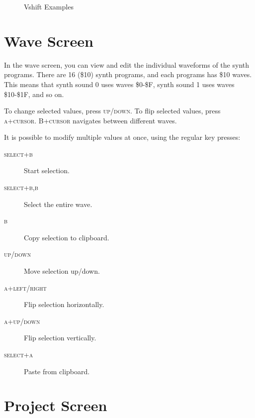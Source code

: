 \begin{figure}[htpb]
	\centering


	\caption{Vshift Examples}
	\label{fig:vshift}
\end{figure}

\section{Wave Screen}
\label{wave-screen-section}

In the wave screen, you can view and edit the individual waveforms of the synth programs. There are 16 (\$10) synth programs, and each programs has \$10 waves. This means that synth sound 0 uses waves \$0-\$F, synth sound 1 uses waves \$10-\$1F, and so on.

To change selected values, press \textsc{up/down}. To flip selected values, press \textsc{a+cursor}. \textsc{B+cursor} navigates between different waves.

It is possible to modify multiple values at once, using the regular key presses:

\begin{description}
	\item[\textsc{select+b}] Start selection.
	\item[\textsc{select+b,b}] Select the entire wave.
	\item[\textsc{b}] Copy selection to clipboard.
	\item[\textsc{up/down}] Move selection up/down.
	\item[\textsc{a+left/right}] Flip selection horizontally.
	\item[\textsc{a+up/down}] Flip selection vertically.
	\item[\textsc{select+a}] Paste from clipboard.
\end{description}

\section{Project Screen}

